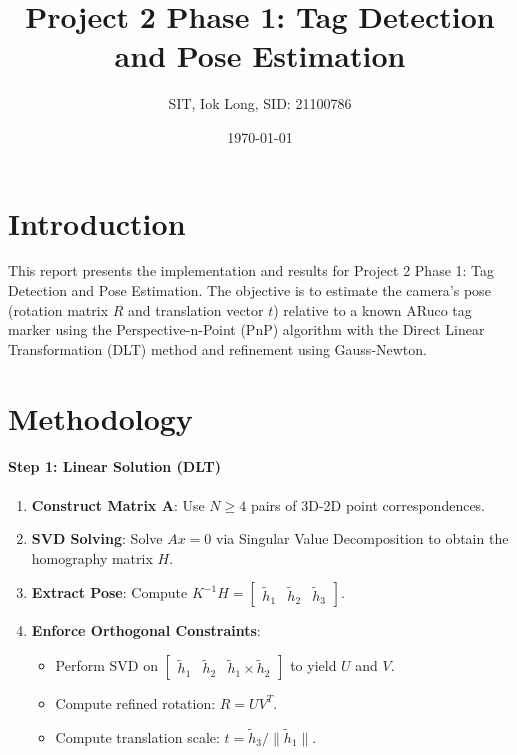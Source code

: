 \documentclass[11pt]{article}
\title{Project 2 Phase 1: Tag Detection and Pose Estimation}
\author{SIT, Iok Long, SID: 21100786}
\date{\today}
\begin{document}
\maketitle

\section{Introduction}
This report presents the implementation and results for Project 2 Phase 1: Tag Detection and Pose Estimation. The objective is to estimate the camera's pose (rotation matrix $R$ and translation vector $t$) relative to a known ARuco tag marker using the Perspective-n-Point (PnP) algorithm with the Direct Linear Transformation (DLT) method and refinement using Gauss-Newton.

\section{Methodology}

\paragraph{Step 1: Linear Solution (DLT)}
\begin{enumerate}
    \item \textbf{Construct Matrix A}: Use $N \geq 4$ pairs of 3D-2D point correspondences.
    \item \textbf{SVD Solving}: Solve $Ax = 0$ via Singular Value Decomposition to obtain the homography matrix $H$.
    \item \textbf{Extract Pose}: Compute $K^{-1}H = \begin{bmatrix} \tilde{h}_1 & \tilde{h}_2 & \tilde{h}_3 \end{bmatrix}$.
    \item \textbf{Enforce Orthogonal Constraints}:
    \begin{itemize}
        \item Perform SVD on $\begin{bmatrix} \tilde{h}_1 & \tilde{h}_2 & \tilde{h}_1 \times \tilde{h}_2 \end{bmatrix}$ to yield $U$ and $V$.
        \item Compute refined rotation: $R = UV^T$.
        \item Compute translation scale: $t = \tilde{h}_3 / \|\tilde{h}_1\|$.
    \end{itemize}
\end{enumerate}
\end{document}

